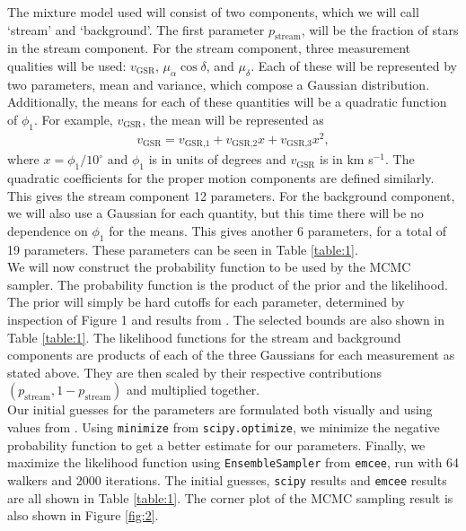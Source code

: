 \documentclass{article}
\begin{document}
The mixture model used will consist of two components, which we will call `stream' and `background'. The first parameter $p_\text{stream}$, will be the fraction of stars in the stream component. For the stream component, three measurement qualities will be used: $v_\text{GSR}$, $\mu_\alpha\cos\delta$, and $\mu_\delta$. Each of these will be represented by two parameters, mean and variance, which compose a Gaussian distribution. Additionally, the means for each of these quantities will be a quadratic function of $\phi_1$. For example, $v_\text{GSR}$, the mean will be represented as
\begin{align}
    v_\text{GSR}=v_\text{GSR,1}+v_\text{GSR,2}x+v_\text{GSR,3}x^2,
\end{align}
where $x=\phi_1/10^\circ$ and $\phi_1$ is in units of degrees and $v_\text{GSR}$ is in km s$^{-1}$. The quadratic coefficients for the proper motion components are defined similarly. This gives the stream component 12 parameters. For the background component, we will also use a Gaussian for each quantity, but this time there will be no dependence on $\phi_1$ for the means. This gives another 6 parameters, for a total of 19 parameters. These parameters can be seen in Table \ref{table:1}.\\

We will now construct the probability function to be used by the MCMC sampler. The probability function is the product of the prior and the likelihood. The prior will simply be hard cutoffs for each parameter, determined by inspection of Figure 1 and results from \citet{2021ApJ...911..149L}. The selected bounds are also shown in Table \ref{table:1}. The likelihood functions for the stream and background components are products of each of the three Gaussians for each measurement as stated above. They are then scaled by their respective contributions $(p_\text{stream},1-p_\text{stream})$ and multiplied together.\\

Our initial guesses for the parameters are formulated both visually and using values from \citet{2021ApJ...911..149L}. Using \texttt{minimize} from \texttt{scipy.optimize}, we minimize the negative probability function to get a better estimate for our parameters. Finally, we maximize the likelihood function using \texttt{EnsembleSampler} from \texttt{emcee}, run with 64 walkers and 2000 iterations. The initial guesses, \texttt{scipy} results and \texttt{emcee} results are all shown in Table \ref{table:1}. The corner plot of the MCMC sampling result is also shown in Figure \ref{fig:2}.\\
\end{document}
